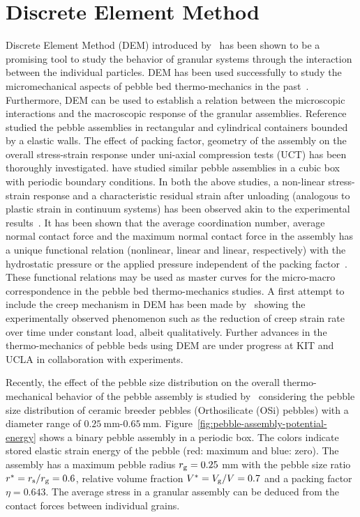 \section{Discrete Element Method}
Discrete Element Method (DEM) introduced by~\cite{Cundall1979} has been shown to be a promising tool to study the behavior of granular systems through the interaction between the individual particles. DEM has been used successfully to study the micromechanical aspects of pebble bed thermo-mechanics in the past~\cite{An20072233,Gan:2010uq}. Furthermore, DEM can be used to establish a relation between the microscopic interactions and the macroscopic response of the granular assemblies. Reference \cite{An20072233} studied the pebble assemblies in rectangular and cylindrical containers bounded by a elastic walls. The effect of packing factor, geometry of the assembly on the overall stress-strain response under uni-axial compression tests (UCT) has been thoroughly investigated. \cite{Gan:2010uq} have studied similar pebble assemblies in a cubic box with periodic boundary conditions. In both the above studies, a non-linear stress-strain response and a characteristic residual strain after unloading (analogous to plastic strain in continuum systems) has been observed akin to the experimental results~\cite{Reimann:2000tw}. It has been shown that the average coordination number, average normal contact force and the maximum normal contact force in the assembly has a unique functional relation (nonlinear, linear and linear, respectively) with the hydrostatic pressure or the applied pressure independent of the packing factor~\cite{Gan:2010uq,An20071393}. These functional relations may be used as master curves for the micro-macro correspondence in the pebble bed thermo-mechanics studies. A first attempt to include the creep mechanism in DEM has been made by~\cite{An20071393} showing the experimentally observed phenomenon such as the reduction of creep strain rate over time under constant load, albeit qualitatively. Further advances in the thermo-mechanics of pebble beds using DEM are under progress at KIT and UCLA in collaboration with experiments.

Recently, the effect of the pebble size distribution on the overall thermo-mechanical behavior of the pebble assembly is studied by~\cite{Annabattula2011} considering the pebble size distribution of ceramic breeder pebbles (Orthosilicate (OSi) pebbles) with a diameter range of $0.25~\mathrm{mm}$-$0.65~\mathrm{mm}$. Figure~\ref{fig:pebble-assembly-potential-energy} shows a binary pebble assembly in a periodic box. The colors indicate stored elastic strain energy of the pebble (red: maximum and blue: zero). The assembly has a maximum pebble radius $r_{\mathrm{g}}=0.25$ mm with the pebble size ratio $r^{*}=r_{\mathrm{s}}/r_{\mathrm{g}}=0.6$, relative volume fraction $V^{*}=V_{\mathrm{g}}/V=0.7$ and a packing factor $\eta=0.643$. The average stress in a granular assembly can be deduced from the contact forces between individual grains.

